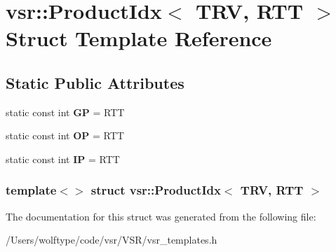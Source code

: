 \hypertarget{structvsr_1_1_product_idx_3_01_t_r_v_00_01_r_t_t_01_4}{\section{vsr\-:\-:Product\-Idx$<$ T\-R\-V, R\-T\-T $>$ Struct Template Reference}
\label{structvsr_1_1_product_idx_3_01_t_r_v_00_01_r_t_t_01_4}
}
\subsection*{Static Public Attributes}
\begin{DoxyCompactItemize}
\item 
\hypertarget{structvsr_1_1_product_idx_3_01_t_r_v_00_01_r_t_t_01_4_acad5760ce1933c571aa1564ee999b38d}{static const int {\bfseries G\-P} = R\-T\-T}\label{structvsr_1_1_product_idx_3_01_t_r_v_00_01_r_t_t_01_4_acad5760ce1933c571aa1564ee999b38d}

\item 
\hypertarget{structvsr_1_1_product_idx_3_01_t_r_v_00_01_r_t_t_01_4_a05cebe0d6f2cfe885b74dd180814e1f3}{static const int {\bfseries O\-P} = R\-T\-T}\label{structvsr_1_1_product_idx_3_01_t_r_v_00_01_r_t_t_01_4_a05cebe0d6f2cfe885b74dd180814e1f3}

\item 
\hypertarget{structvsr_1_1_product_idx_3_01_t_r_v_00_01_r_t_t_01_4_a34e01d65589e29e563ff3862e2d06e03}{static const int {\bfseries I\-P} = R\-T\-T}\label{structvsr_1_1_product_idx_3_01_t_r_v_00_01_r_t_t_01_4_a34e01d65589e29e563ff3862e2d06e03}

\end{DoxyCompactItemize}
\subsubsection*{template$<$$>$ struct vsr\-::\-Product\-Idx$<$ T\-R\-V, R\-T\-T $>$}



The documentation for this struct was generated from the following file\-:\begin{DoxyCompactItemize}
\item 
/\-Users/wolftype/code/vsr/\-V\-S\-R/vsr\-\_\-templates.\-h\end{DoxyCompactItemize}
